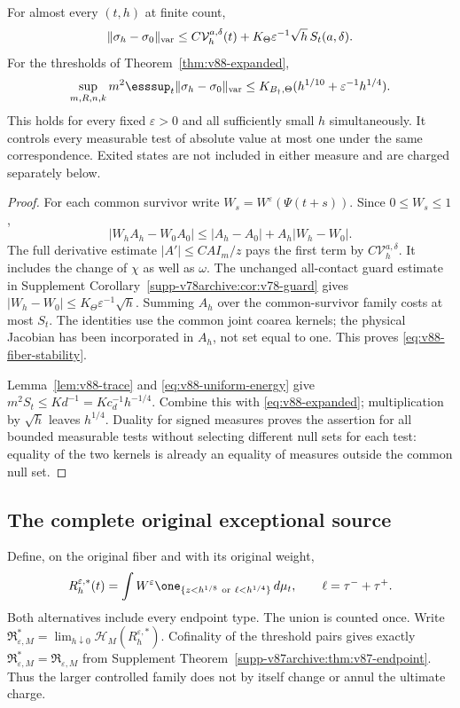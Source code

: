 \begin{theorem}
\label{thm:v88-fiber-stability}
For almost every $(t,h)$ at finite count,
\begin{equation}\label{eq:v88-fiber-stability}
 \|\sigma_h-\sigma_0\|_{\rm var}
 \le C\mathcal V_h^{a,\delta}(t)
                 +K_\Theta\varepsilon^{-1}\sqrt h\,S_t(a,\delta).
\end{equation}
For the thresholds of Theorem~\ref{thm:v88-expanded},
\begin{equation}\label{eq:v88-fiber-finite}
 \sup_{m,R,n,k}m^2\esssup_t\|\sigma_h-\sigma_0\|_{\rm var}
 \le K_{B_\dagger,\Theta}
                   (h^{1/10}+\varepsilon^{-1}h^{1/4}).
\end{equation}
This holds for every fixed $\varepsilon>0$ and all sufficiently small
$h$ simultaneously. It controls every measurable test of absolute
value at most one under the same correspondence. Exited states are
not included in either measure and are charged separately below.
\end{theorem}
\begin{proof}
For each common survivor write $W_s=W^\varepsilon(\Psi(t+s))$.
Since $0\le W_s\le1$,
\[
 |W_hA_h-W_0A_0|\le|A_h-A_0|+A_h|W_h-W_0|.
\]
The full derivative estimate $|A'|\le CAI_m/z$ pays the first
term by $C\mathcal V_h^{a,\delta}$. It includes the change of
$\chi$ as well as $\omega$. The unchanged all-contact guard estimate
in Supplement Corollary~\ref{supp-v78archive:cor:v78-guard} gives
$|W_h-W_0|\le K_\Theta\varepsilon^{-1}\sqrt h$.
Summing $A_h$ over the common-survivor family costs at most $S_t$.
The identities use the common joint coarea kernels; the physical
Jacobian has been incorporated in $A_h$, not set equal to one.
This proves \eqref{eq:v88-fiber-stability}.

Lemma~\ref{lem:v88-trace} and \eqref{eq:v88-uniform-energy} give
$m^2S_t\le Kd^{-1}=Kc_d^{-1}h^{-1/4}$. Combine this with
\eqref{eq:v88-expanded}; multiplication by $\sqrt h$ leaves
$h^{1/4}$. Duality for signed measures proves the assertion for all
bounded measurable tests without selecting different null sets for
each test: equality of the two kernels is already an equality of
measures outside the common null set.
\end{proof}

\subsection{The complete original exceptional source}
Define, on the original fiber and with its original weight,
\begin{equation}\label{eq:v88-residual}
 R_h^{\varepsilon,*}(t)=\int W^\varepsilon
     \one_{\{z<h^{1/8}\ \mathrm{or}\ \ell<h^{1/4}\}}\,d\mu_t,
 \qquad \ell=\tau^-+\tau^+.
\end{equation}
Both alternatives include every endpoint type. The union is counted
once. Write $\mathfrak R_{\varepsilon,M}^*
=\lim_{h\downarrow0}\mathcal H_M(R_h^{\varepsilon,*})$.
Cofinality of the threshold pairs gives exactly
$\mathfrak R_{\varepsilon,M}^*=\mathfrak R_{\varepsilon,M}$
from Supplement Theorem~\ref{supp-v87archive:thm:v87-endpoint}.
Thus the larger controlled family does not by itself change or annul
the ultimate charge.

